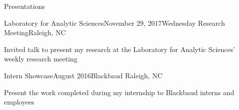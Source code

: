 \documentclass{resume} %
\begin{document}
\begin{rSection}{Presentations}
\begin{rSubsection}{Laboratory for Analytic Sciences}{November 29, 2017}{Wednesday Research Meeting}{Raleigh, NC}
\item Invited talk to present my research at the Laboratory for Analytic Sciences' weekly research meeting
\end{rSubsection}
\vspace{-5pt}

\begin{rSubsection}{Intern Showcase}{August 2016}{Blackbaud }{Raleigh, NC}
\item Present the work completed during my internship to Blackbaud interns and employees
\end{rSubsection}

\end{rSection}
\vspace{-10pt}
\end{document}
